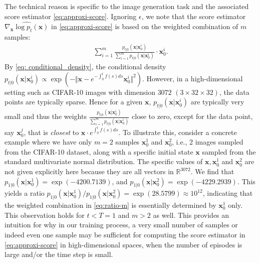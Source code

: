 \documentclass[11pt]{article}
\begin{document}
The technical reason is specific to the image generation task and the associated score estimator \eqref{eq:approxi-score}. Ignoring $\epsilon$, we note that the score estimator $\widehat{ \nabla_{\mathbf{x}}\log p_{t}(\mathbf{x}) }$ in \eqref{eq:approxi-score} is based on the weighted combination of $m$ samples:
\begin{align}\label{eq:ratio-m}
 \sum_{i=1}^m  \frac{     p_{t|0}(\mathbf{x} | \mathbf{x}^{i}_{0})  }{  \sum_{i=1}^m   p_{t|0}(\mathbf{x} | \mathbf{x}^i_{0}) }  \cdot  {\mathbf{x}^{i}_{0}  }.
\end{align}
By \eqref{eq: conditional_density}, the conditional density $p_{t|0}(\mathbf{x} | \mathbf{x}^i_{0}) \propto  \exp\left(-  \Vert\mathbf{x}-e^{-\int_{0}^{t}f(s)ds}\mathbf{x}^{i}_{0}\Vert^{2}  \right)$. However, in a high-dimensional setting such as CIFAR-10 images with dimension $3072$ $(3 \times 32 \times 32)$, the data points are typically sparse. Hence for a given $\mathbf{x}$, $p_{t|0}(\mathbf{x} | \mathbf{x}^i_{0})$ are typically very small  and thus the weights $\frac{     p_{t|0}(\mathbf{x} | \mathbf{x}^{i}_{0})  }{  \sum_{i=1}^m   p_{t|0}(\mathbf{x} | \mathbf{x}^i_{0}) }$  close to zero, except for the data point, say $\mathbf{x}^j_{0}$, that is {\it closest} to $ \mathbf{x} \cdot e^{\int_{0}^{t} f(s)ds}$.
To illustrate this, consider a concrete example where we have only $m=2$ samples $\mathbf{x}^{1}_{0}$ and $ \mathbf{x}^{2}_{0}$, i.e., 2 images sampled from the CIFAR-10 dataset, along with a specific initial state $\mathbf{x}$ sampled from the standard multivariate normal distribution.
The specific values of $\mathbf{x},  \mathbf{x}^{1}_{0}$ and $\mathbf{x}^{2}_{0}$ are not given explicitly here because they are all vectors in $\mathbb{R}^{3072}$.
We find that $p_{1|0}(\mathbf{x} | \mathbf{x}^{1}_{0}) = \exp(-4200.7139)$, and $p_{1|0}(\mathbf{x} | \mathbf{x}^{2}_{0}) = \exp(-4229.2939)$. This yields a ratio  $p_{1|0}(\mathbf{x} | \mathbf{x}^{1}_{0}) / p_{1|0}(\mathbf{x} | \mathbf{x}^{2}_{0}) =\exp(28.5799)\approx10^{12}$, indicating that the weighted combination in \eqref{eq:ratio-m} is essentially determined by $\mathbf{x}^{1}_{0}$ only. 
This observation holds for $t< T=1$ and $m>2$ as well.
This provides an intuition for why in our training process, a very small number of samples or indeed even one sample may be sufficient for computing the score estimator in \eqref{eq:approxi-score} in high-dimensional spaces, when the number of episodes is large and/or the time step is small.
\end{document}
